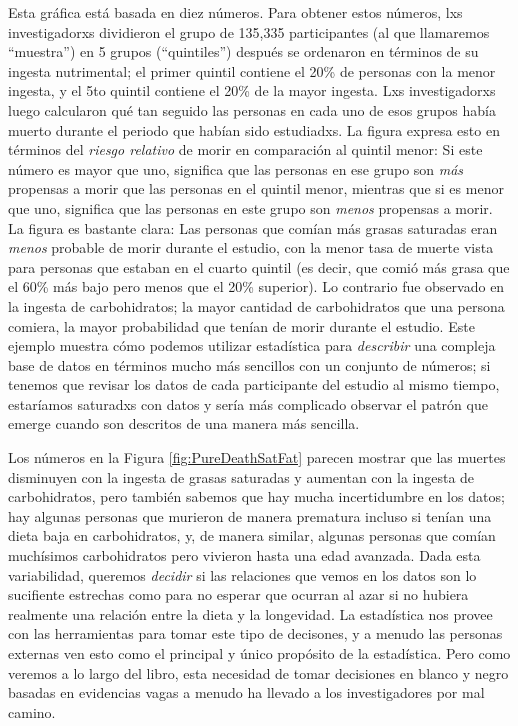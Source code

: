 \documentclass[
  12pt,
]{book}
\theoremstyle{definition}
\theoremstyle{definition}
\theoremstyle{definition}
\theoremstyle{remark}
\begin{document}
Esta gráfica está basada en diez números. Para obtener estos números, lxs investigadorxs dividieron el grupo de 135,335 participantes (al que llamaremos ``muestra'') en 5 grupos (``quintiles'') después se ordenaron en términos de su ingesta nutrimental; el primer quintil contiene el 20\% de personas con la menor ingesta, y el 5to quintil contiene el 20\% de la mayor ingesta. Lxs investigadorxs luego calcularon qué tan seguido las personas en cada uno de esos grupos había muerto durante el periodo que habían sido estudiadxs. La figura expresa esto en términos del \emph{riesgo relativo} de morir en comparación al quintil menor: Si este número es mayor que uno, significa que las personas en ese grupo son \emph{más} propensas a morir que las personas en el quintil menor, mientras que si es menor que uno, significa que las personas en este grupo son \emph{menos} propensas a morir. La figura es bastante clara: Las personas que comían más grasas saturadas eran \emph{menos} probable de morir durante el estudio, con la menor tasa de muerte vista para personas que estaban en el cuarto quintil (es decir, que comió más grasa que el 60\% más bajo pero menos que el 20\% superior). Lo contrario fue observado en la ingesta de carbohidratos; la mayor cantidad de carbohidratos que una persona comiera, la mayor probabilidad que tenían de morir durante el estudio. Este ejemplo muestra cómo podemos utilizar estadística para \emph{describir} una compleja base de datos en términos mucho más sencillos con un conjunto de números; si tenemos que revisar los datos de cada participante del estudio al mismo tiempo, estaríamos saturadxs con datos y sería más complicado observar el patrón que emerge cuando son descritos de una manera más sencilla.

Los números en la Figura \ref{fig:PureDeathSatFat} parecen mostrar que las muertes disminuyen con la ingesta de grasas saturadas y aumentan con la ingesta de carbohidratos, pero también sabemos que hay mucha incertidumbre en los datos; hay algunas personas que murieron de manera prematura incluso si tenían una dieta baja en carbohidratos, y, de manera similar, algunas personas que comían muchísimos carbohidratos pero vivieron hasta una edad avanzada. Dada esta variabilidad, queremos \emph{decidir} si las relaciones que vemos en los datos son lo sucifiente estrechas como para no esperar que ocurran al azar si no hubiera realmente una relación entre la dieta y la longevidad. La estadística nos provee con las herramientas para tomar este tipo de decisones, y a menudo las personas externas ven esto como el principal y único propósito de la estadística. Pero como veremos a lo largo del libro, esta necesidad de tomar decisiones en blanco y negro basadas en evidencias vagas a menudo ha llevado a los investigadores por mal camino.
\end{document}
